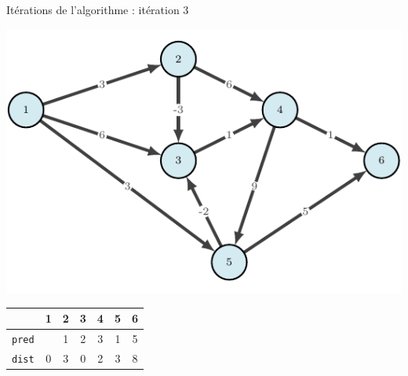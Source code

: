 \begin{frame}{Itérations de l'algorithme : itération 3}
    \begin{center}
        \includegraphics[height=.6\textheight]{fig/bellman-0.pdf}      
    \begin{tabular}{c|cccccc}
      
        & 1    &2      &3      &4      &5      &6      \\
        \hline
        \texttt{pred} & &1      &2      &3      &1      &5      \\
        \texttt{dist} & 0       &3      &0      &2      &3      &8      \\
            \end{tabular}
\end{center}
\end{frame}

